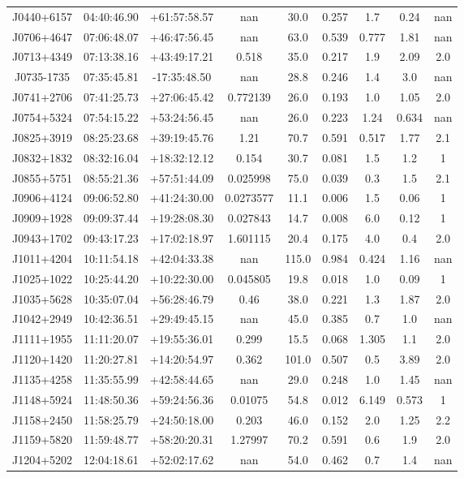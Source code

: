 \begin{table}[H]
\begin{tabular}{@{}ccccccccc@{}}
        J0440+6157 & 04:40:46.90 & +61:57:58.57 & nan & 30.0 & 0.257 & 1.7 & 0.24 & nan \\
        J0706+4647 & 07:06:48.07 & +46:47:56.45 & nan & 63.0 & 0.539 & 0.777 & 1.81 & nan \\
        J0713+4349 & 07:13:38.16 & +43:49:17.21 & 0.518 & 35.0 & 0.217 & 1.9 & 2.09 & 2.0 \\
        J0735-1735 & 07:35:45.81 & -17:35:48.50 & nan & 28.8 & 0.246 & 1.4 & 3.0 & nan \\
        J0741+2706 & 07:41:25.73 & +27:06:45.42 & 0.772139 & 26.0 & 0.193 & 1.0 & 1.05 & 2.0 \\
        J0754+5324 & 07:54:15.22 & +53:24:56.45 & nan & 26.0 & 0.223 & 1.24 & 0.634 & nan \\
        J0825+3919 & 08:25:23.68 & +39:19:45.76 & 1.21 & 70.7 & 0.591 & 0.517 & 1.77 & 2.1 \\
        J0832+1832 & 08:32:16.04 & +18:32:12.12 & 0.154 & 30.7 & 0.081 & 1.5 & 1.2 & 1 \\
        J0855+5751 & 08:55:21.36 & +57:51:44.09 & 0.025998 & 75.0 & 0.039 & 0.3 & 1.5 & 2.1 \\
        J0906+4124 & 09:06:52.80 & +41:24:30.00 & 0.0273577 & 11.1 & 0.006 & 1.5 & 0.06 & 1 \\
        J0909+1928 & 09:09:37.44 & +19:28:08.30 & 0.027843 & 14.7 & 0.008 & 6.0 & 0.12 & 1 \\
        J0943+1702 & 09:43:17.23 & +17:02:18.97 & 1.601115 & 20.4 & 0.175 & 4.0 & 0.4 & 2.0 \\
        J1011+4204 & 10:11:54.18 & +42:04:33.38 & nan & 115.0 & 0.984 & 0.424 & 1.16 & nan \\
        J1025+1022 & 10:25:44.20 & +10:22:30.00 & 0.045805 & 19.8 & 0.018 & 1.0 & 0.09 & 1 \\
        J1035+5628 & 10:35:07.04 & +56:28:46.79 & 0.46 & 38.0 & 0.221 & 1.3 & 1.87 & 2.0 \\
        J1042+2949 & 10:42:36.51 & +29:49:45.15 & nan & 45.0 & 0.385 & 0.7 & 1.0 & nan \\
        J1111+1955 & 11:11:20.07 & +19:55:36.01 & 0.299 & 15.5 & 0.068 & 1.305 & 1.1 & 2.0 \\
        J1120+1420 & 11:20:27.81 & +14:20:54.97 & 0.362 & 101.0 & 0.507 & 0.5 & 3.89 & 2.0 \\
        J1135+4258 & 11:35:55.99 & +42:58:44.65 & nan & 29.0 & 0.248 & 1.0 & 1.45 & nan \\
        J1148+5924 & 11:48:50.36 & +59:24:56.36 & 0.01075 & 54.8 & 0.012 & 6.149 & 0.573 & 1 \\
        J1158+2450 & 11:58:25.79 & +24:50:18.00 & 0.203 & 46.0 & 0.152 & 2.0 & 1.25 & 2.2 \\
        J1159+5820 & 11:59:48.77 & +58:20:20.31 & 1.27997 & 70.2 & 0.591 & 0.6 & 1.9 & 2.0 \\
        J1204+5202 & 12:04:18.61 & +52:02:17.62 & nan & 54.0 & 0.462 & 0.7 & 1.4 & nan \\

        \bottomrule
    \end{tabular}
\end{table}

